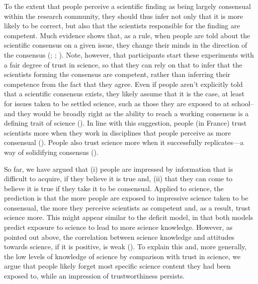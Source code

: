 \documentclass[
  jou,
  floatsintext,
  longtable,
  nolmodern,
  notxfonts,
  notimes,
  colorlinks=true,linkcolor=blue,citecolor=blue,urlcolor=blue]{apa7}
\begin{document}
To the extent that people perceive a scientific finding as being largely
consensual within the research community, they should thus infer not
only that it is more likely to be correct, but also that the scientists
responsible for the finding are competent. Much evidence shows that, as
a rule, when people are told about the scientific consensus on a given
issue, they change their minds in the direction of the consensus
(;
;
). Note, however, that participants start these experiments with a
fair degree of trust in science, so that they can rely on that to infer
that the scientists forming the consensus are competent, rather than
inferring their competence from the fact that they agree. Even if people
aren't explicitly told that a scientific consensus exists, they likely
assume that it is the case, at least for issues taken to be settled
science, such as those they are exposed to at school--and they would be
broadly right as the ability to reach a working consensus is a defining
trait of science
().
In line with this suggestion, people (in France) trust scientists more
when they work in disciplines that people perceive as more consensual
().
People also trust science more when it successfully replicates---a way
of solidifying consensus
().

So far, we have argued that (i) people are impressed by information that
is difficult to acquire, if they believe it is true and, (ii) that they
can come to believe it is true if they take it to be consensual. Applied
to science, the prediction is that the more people are exposed to
impressive science taken to be consensual, the more they perceive
scientists as competent and, as a result, trust science more. This might
appear similar to the deficit model, in that both models predict
exposure to science to lead to more science knowledge. However, as
pointed out above, the correlation between science knowledge and
attitudes towards science, if it is positive, is weak
().
To explain this and, more generally, the low levels of knowledge of
science by comparison with trust in science, we argue that people likely
forget most specific science content they had been exposed to, while an
impression of trustworthiness persists.
\end{document}
